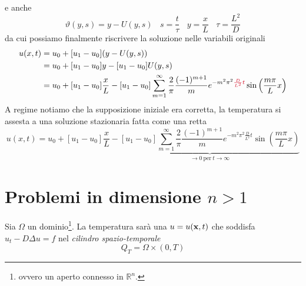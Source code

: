 e anche
\begin{equation*}
    \vartheta(y,s) =y-U(y,s) \ \ \ \ s=\frac{t}{\tau } \ \ \ \ y=\frac{x}{L} \ \ \ \ \tau =\frac{L^{2}}{D}
\end{equation*}
da cui possiamo finalmente riscrivere la soluzione nelle variabili originali
\begin{align*}
    u(x,t) & =u_{0} +[ u_{1} -u_{0}](y-U(y,s))                                                                                                                                                                                                                         \\
           & =u_{0} +[ u_{1} -u_{0}] y-[ u_{1} -u_{0}] U(y,s)                                                                                                                                                                                                          \\
           & =u_{0} +[ u_{1} -u_{0}]\frac{x}{L} -[ u_{1} -u_{0}]\sum\limits ^{\infty }_{m=1}\frac{2}{\pi }\frac{(-1)^{m+1}}{m} e^{-m^{2} \pi ^{2}\textcolor[rgb]{0.82,0.01,0.11}{\frac{D}{L^{2}}}\textcolor[rgb]{0.82,0.01,0.11}{t}}\sin\left(\frac{m\pi }{L} x\right)
\end{align*}
A regime notiamo che la supposizione iniziale era corretta, la temperatura si assesta a una soluzione stazionaria fatta come una retta
\begin{equation*}
    u(x,t) =u_{0} +[ u_{1} -u_{0}]\frac{x}{L} -\underbrace{[ u_{1} -u_{0}]\sum\limits ^{\infty }_{m=1}\frac{2}{\pi }\frac{(-1)^{m+1}}{m} e^{-m^{2} \pi ^{2}\frac{D}{L^{2}} t}\sin\left(\frac{m\pi }{L} x\right)}_{\rightarrow 0\ \text{per} \ t\rightarrow \infty }
\end{equation*}


\section{Problemi in dimensione \texorpdfstring{$n>1$}{n>1}}

Sia $\displaystyle \Omega $ un dominio\footnote{ovvero un aperto connesso in $\displaystyle \mathbb{R}^{n}$.}. La temperatura sarà una $u=u(\mathbf{x},t)$ che soddisfa $u_{t} -D\Delta u=f$ nel \textit{cilindro spazio-temporale}
\begin{equation*}
    Q_{T} =\Omega \times (0,T)
\end{equation*}


